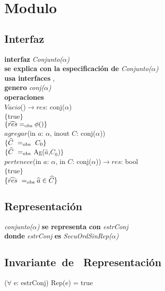 \section*{Modulo }

\subsection*{Interfaz}
\textbf{interfaz} \textit{Conjunto($\alpha$)}\\
\textbf{se explica con la especificaci\'on de} \textit{Conjunto($\alpha$)}\\
\textbf{usa interfaces} , \\
\textbf{genero} \textit{conj($\alpha$)}\\

\textbf{operaciones}\\
$Vacio$()$\longrightarrow res$: conj($\alpha$)\\
$\{$true$\}$\\
$\{\widehat{res} =_{\mathrm{obs}} \phi()\}$\\

$agregar$(in $a$: $\alpha$, inout $C$: conj($\alpha$))\\
$\{\widehat{C}\ =_{\mathrm{obs}}\ C_0\}$\\
$\{\widehat{C}\ =_{\mathrm{obs}}$ Ag($\widehat{a}$,$C_0$)$\}$\\

$pertenece$(in $a$: $\alpha$, in $C$: conj($\alpha$))$\longrightarrow res$: bool\\
$\{$true$\}$\\
$\{\widehat{res}\ =_{\mathrm{obs}} \widehat{a}\in \widehat{C}\}$\\

\subsection*{Representaci\'on}
\textit{conjunto($\alpha$)} \textbf{se representa con} \textit{estrConj}\\
\textbf{donde} \textit{estrConj} \textbf{es} \textit{SecuOrdSinRep($\alpha$)}\\

\subsection*{Invariante\ de \ Representaci\'on}
\vspace{11pt}
($\forall$ e: estrConj) Rep(e) = true
\vspace{33pt}

